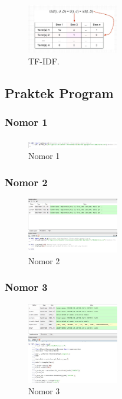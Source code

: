 \begin{figure}[H]
\centering
\includegraphics[width=4cm]{figures/1174066/4/5.jpg}
\caption{TF-IDF.}
\end{figure}

\subsection{Praktek Program}
\subsubsection{Nomor 1}
\hfill\break

\begin{figure}[H]
\centering
\includegraphics[width=4cm]{figures/1174066/4/no1.jpg}
\caption{Nomor 1}
\end{figure}

\subsubsection{Nomor 2}
\hfill\break

\begin{figure}[H]
\centering
\includegraphics[width=4cm]{figures/1174066/4/no2.jpg}
\caption{Nomor 2}
\end{figure}

\subsubsection{Nomor 3}
\hfill\break

\begin{figure}[H]
\centering
\includegraphics[width=4cm]{figures/1174066/4/no3.jpg}
\caption{Nomor 3}
\end{figure}


